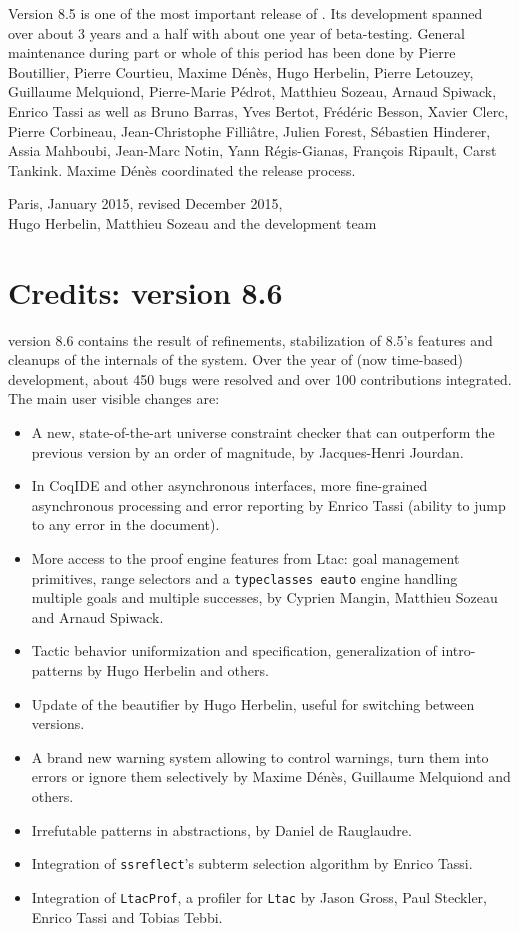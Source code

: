 Version 8.5 is one of the most important release of {\Coq}. Its
development spanned over about 3 years and a half with about one year
of beta-testing. General maintenance during part or whole of this
period has been done by Pierre Boutillier, Pierre Courtieu, Maxime
Dénès, Hugo Herbelin, Pierre Letouzey, Guillaume Melquiond,
Pierre-Marie Pédrot, Matthieu Sozeau, Arnaud Spiwack, Enrico Tassi as
well as Bruno Barras, Yves Bertot, Frédéric Besson, Xavier Clerc,
Pierre Corbineau, Jean-Christophe Filliâtre, Julien Forest, Sébastien
Hinderer, Assia Mahboubi, Jean-Marc Notin, Yann Régis-Gianas, François
Ripault, Carst Tankink. Maxime Dénès coordinated the release process.

\begin{flushright}
Paris, January 2015, revised December 2015,\\
Hugo Herbelin, Matthieu Sozeau and the {\Coq} development team\\
\end{flushright}

\section*{Credits: version 8.6}

{\Coq} version 8.6 contains the result of refinements, stabilization of
8.5's features and cleanups of the internals of the system. Over the
year of (now time-based) development, about 450 bugs were resolved and
over 100 contributions integrated. The main user visible changes are:
\begin{itemize}
\item A new, state-of-the-art universe constraint checker that
  can outperform the previous version by an order of magnitude, by
  Jacques-Henri Jourdan.
\item In CoqIDE and other asynchronous interfaces, more fine-grained
  asynchronous processing and error reporting by Enrico Tassi (ability
  to jump to any error in the document).
\item More access to the proof engine features from Ltac: goal
  management primitives, range selectors and a {\tt typeclasses
    eauto} engine handling multiple goals and multiple successes, by
  Cyprien Mangin, Matthieu Sozeau and Arnaud Spiwack.
\item Tactic behavior uniformization and specification, generalization
  of intro-patterns by Hugo Herbelin and others.
\item Update of the beautifier by Hugo Herbelin, useful for switching
  between versions.
\item A brand new warning system allowing to control warnings, turn them
  into errors or ignore them selectively by Maxime Dénès, Guillaume
  Melquiond and others.
\item Irrefutable patterns in abstractions, by Daniel de Rauglaudre.
\item Integration of {\tt ssreflect}'s subterm selection algorithm by
  Enrico Tassi.
\item Integration of {\tt LtacProf}, a profiler for {\tt Ltac} by Jason
  Gross, Paul Steckler, Enrico Tassi and Tobias Tebbi.
\end{itemize}

